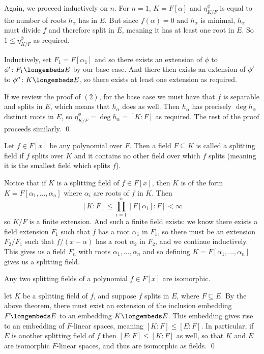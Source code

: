     \item Again, we proceed inductively on $n$.
    For $n=1$, $K=F[\alpha]$ and $\eta_{K/F}^\phi$ is equal to the number of roots $h_\alpha$ has in $E$.
    But since $f(\alpha)=0$ and $h_\alpha$ is minimal, $h_\alpha$ must divide $f$ and therefore split in $E$, meaning it has at least one root in $E$.
    So $1\leq\eta^\phi_{K/F}$ as required.

    Inductively, set $F_1=F[\alpha_1]$ and so there exists an extension of $\phi$ to $\phi'\colon F_1\longembeds E$ by our base case.
    And there then exists an extension of $\phi'$ to $\phi''\colon K\longembeds E$, so there exists at least one extension as required.

    \item If we review the proof of $(2)$, for the base case we must have that $f$ is separable and splits in $E$, which means that $h_\alpha$ does as well.
    Then $h_\alpha$ has precisely $\deg h_\alpha$ distinct roots in $E$, so $\eta^\phi_{K/F}=\deg h_\alpha=[K:F]$ as required.
    The rest of the proof proceeds similarly.
    \qed
\eenum
\egroup

\bdefn

    Let $f\in F[x]$ be any polynomial over $F$.
    Then a field $F\subseteq K$ is called a {\emphcolor splitting field} if $f$ splits over $K$ and it contains no other field over which $f$ splits (meaning it is the smallest field which splits $f$).

\edefn

Notice that if $K$ is a splitting field of $f\in F[x]$, then $K$ is of the form $K=F[\alpha_1,\dots,\alpha_n]$ where $\alpha_i$ are roots of $f$ in $K$.
Then
$$ [K:F] \leq \prod_{i=1}^n[F[\alpha_i]:F] < \infty $$
so $K/F$ is a finite extension.
And such a finite field exists: we know there exists a field extension $F_1$ such that $f$ has a root $\alpha_1$ in $F_1$, so there must be an extension $F_2/F_1$ such that $f/(x-\alpha)$ has a root
$\alpha_2$ in $F_2$, and we continue inductively.
This gives us a field $F_n$ with roots $\alpha_1,\dots,\alpha_n$ and so defining $K=F[\alpha_1,\dots,\alpha_n]$ gives us a splitting field.

\bthrm

    Any two splitting fields of a polynomial $f\in F[x]$ are isomorphic.

\ethrm

\Proof let $K$ be a splitting field of $f$, and suppose $f$ splits in $E$, where $F\subseteq E$.
By the above theorem, there must exist an extension of the inclusion embedding $F\longembeds E$ to an embedding $K\longembeds E$.
This embedding gives rise to an embedding of $F$-linear spaces, meaning $[K:F]\leq[E:F]$.
In particular, if $E$ is another splitting field of $f$ then $[E:F]\leq[K:F]$ as well, so that $K$ and $E$ are isomorphic $F$-linear spaces, and thus are isomorphic as fields.
\qed

